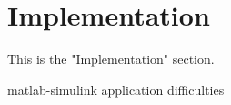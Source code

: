 \section{Implementation}

This is the "Implementation" section.

{matlab-simulink}
{application}
{difficulties}
